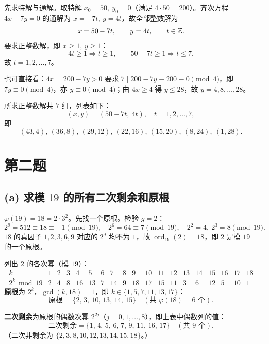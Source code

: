 \documentclass{article}
\newcommand{\ord}{\operatorname{ord}}
\begin{document}
\begin{solution}
先求特解与通解。取特解 $x_0=50,\ y_0=0$（满足 $4\cdot 50=200$）。齐次方程 $4x+7y=0$ 的通解为 $x=-7t,\ y=4t$，故全部整数解为
\[
  x=50-7t,\qquad y=4t,\qquad t\in\mathbb{Z}.
\]
要求正整数解，即 $x\ge 1,\ y\ge 1$：
\[
  4t\ge 1\Rightarrow t\ge 1,\qquad 50-7t\ge 1\Rightarrow t\le 7.
\]
故 $t=1,2,\dots,7$。

也可直接看：$4x=200-7y>0$ 要求 $7\mid 200-7y\equiv 200\equiv 0\pmod 4$，即 $7y\equiv 0\pmod 4$，亦 $y\equiv 0\pmod 4$；由 $4x\ge 4$ 得 $y\le 28$，故 $y=4,8,\dots,28$。

\medskip\noindent
所求正整数解共 $7$ 组，列表如下：
\[
  \boxed{(x,y)=(50-7t,\ 4t),\quad t=1,2,\dots,7,}
\]
即
\[
  (43,4),\ (36,8),\ (29,12),\ (22,16),\ (15,20),\ (8,24),\ (1,28).
\]
\end{solution}

\section{第二题}

\subsection*{(a) 求模 $19$ 的所有二次剩余和原根}

\begin{solution}
$\varphi(19)=18=2\cdot 3^{2}$。先找一个原根。检验 $g=2$：
\[
  2^{9}=512\equiv 18\equiv -1\pmod{19},\quad
  2^{6}=64\equiv 7\pmod{19},\quad
  2^{2}=4,\ 2^{3}=8\pmod{19}.
\]
$18$ 的真因子 $1,2,3,6,9$ 对应的 $2^{d}$ 均不为 $1$，故 $\ord_{19}(2)=18$，即 $2$ 是模 $19$ 的一个原根。

列出 $2$ 的各次幂（模 $19$）：
\[
\begin{array}{c|cccccccccccccccccc}
  k & 1&2&3&4&5&6&7&8&9&10&11&12&13&14&15&16&17&18\\ \hline
  2^{k}\bmod 19 & 2&4&8&16&13&7&14&9&18&17&15&11&3&6&12&5&10&1
\end{array}
\]
\textbf{原根}为 $2^{k}$，$\gcd(k,18)=1$，即 $k\in\{1,5,7,11,13,17\}$：
\[
  \boxed{\text{原根}=\{2,\,3,\,10,\,13,\,14,\,15\}\quad(\text{共 }\varphi(18)=6\text{ 个}).}
\]

\textbf{二次剩余}为原根的偶数次幂 $2^{2j}$（$j=0,1,\dots,8$），即上表中偶数列的值：
\[
  \boxed{\text{二次剩余}=\{1,\,4,\,5,\,6,\,7,\,9,\,11,\,16,\,17\}\quad(\text{共 }9\text{ 个}).}
\]
（二次非剩余为 $\{2,3,8,10,12,13,14,15,18\}$。）
\end{solution}
\end{document}
